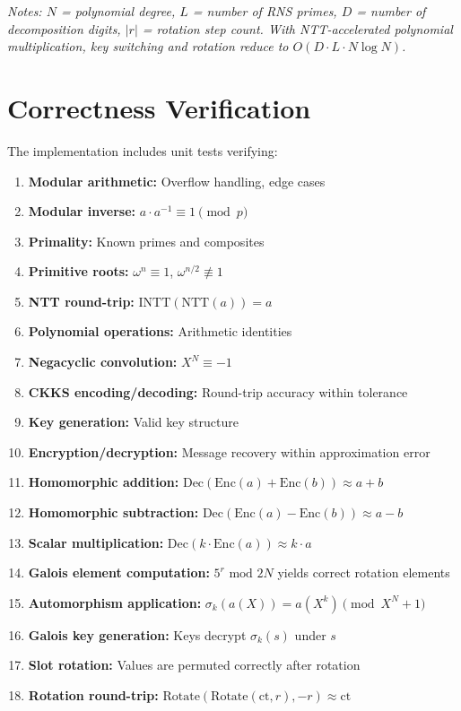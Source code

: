 \documentclass[11pt,a4paper]{article}
\newcommand{\bmod}{\text{ mod }}
\begin{document}
\textit{Notes: $N$ = polynomial degree, $L$ = number of RNS primes, $D$ = number of decomposition digits, $|r|$ = rotation step count. With NTT-accelerated polynomial multiplication, key switching and rotation reduce to $O(D \cdot L \cdot N \log N)$.}

\section{Correctness Verification}

The implementation includes unit tests verifying:

\begin{enumerate}
    \item \textbf{Modular arithmetic:} Overflow handling, edge cases
    \item \textbf{Modular inverse:} $a \cdot a^{-1} \equiv 1 \pmod{p}$
    \item \textbf{Primality:} Known primes and composites
    \item \textbf{Primitive roots:} $\omega^n \equiv 1$, $\omega^{n/2} \not\equiv 1$
    \item \textbf{NTT round-trip:} $\text{INTT}(\text{NTT}(a)) = a$
    \item \textbf{Polynomial operations:} Arithmetic identities
    \item \textbf{Negacyclic convolution:} $X^N \equiv -1$
    \item \textbf{CKKS encoding/decoding:} Round-trip accuracy within tolerance
    \item \textbf{Key generation:} Valid key structure
    \item \textbf{Encryption/decryption:} Message recovery within approximation error
    \item \textbf{Homomorphic addition:} $\text{Dec}(\text{Enc}(a) + \text{Enc}(b)) \approx a + b$
    \item \textbf{Homomorphic subtraction:} $\text{Dec}(\text{Enc}(a) - \text{Enc}(b)) \approx a - b$
    \item \textbf{Scalar multiplication:} $\text{Dec}(k \cdot \text{Enc}(a)) \approx k \cdot a$
    \item \textbf{Galois element computation:} $5^r \bmod 2N$ yields correct rotation elements
    \item \textbf{Automorphism application:} $\sigma_k(a(X)) = a(X^k) \pmod{X^N + 1}$
    \item \textbf{Galois key generation:} Keys decrypt $\sigma_k(s)$ under $s$
    \item \textbf{Slot rotation:} Values are permuted correctly after rotation
    \item \textbf{Rotation round-trip:} $\text{Rotate}(\text{Rotate}(\text{ct}, r), -r) \approx \text{ct}$
\end{enumerate}
\end{document}
